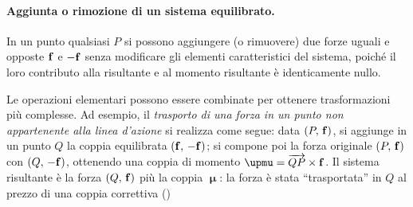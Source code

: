 \paragraph{Aggiunta o rimozione di un sistema equilibrato.}
In un punto qualsiasi $P$ si possono aggiungere (o rimuovere)
due forze uguali e opposte $\mathbf{f}$ e $-\mathbf{f}$ senza modificare gli
elementi caratteristici del sistema, poiché il loro contributo
alla risultante e al momento risultante è identicamente nullo.





\begin{oss}
	Le operazioni elementari possono essere combinate per
	ottenere trasformazioni più complesse. Ad esempio, il
	\textit{trasporto di una forza in un punto non appartenente
		alla linea d'azione} si realizza come segue: data
	$(P,\,\mathbf{f})$, si aggiunge in un punto $Q$ la coppia
	equilibrata $(\mathbf{f},\,-\mathbf{f})$; si compone poi la forza
	originale $(P,\,\mathbf{f})$ con $(Q,\,-\mathbf{f})$, ottenendo una
	coppia di momento
	$\bm{\upmu} = \overrightarrow{QP}\times\fb$. Il sistema
	risultante è la forza $(Q,\,\mathbf{f})$ più la coppia
	$\bm{\upmu}$: la forza è stata ``trasportata'' in $Q$ al
	prezzo di una coppia correttiva ()
	\begin{figure}[htbp]
		\centering
		\qquad
\end{figure}
\end{oss}
